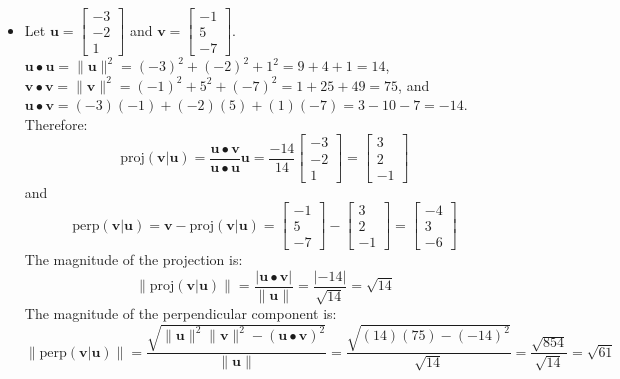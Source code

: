\documentclass{article}
\begin{document}
\begin{itemize}
\item Let \(\mathbf{u} = \begin{bmatrix} -3 \\ -2 \\ 1 \end{bmatrix}\) and \(\mathbf{v} = \begin{bmatrix} -1 \\ 5 \\ -7 \end{bmatrix}\). \\
\(\mathbf{u} \bullet \mathbf{u} = \|\mathbf{u}\|^2 = (-3)^2 + (-2)^2 + 1^2 = 9 + 4 + 1 = 14\), \\
\(\mathbf{v} \bullet \mathbf{v} = \|\mathbf{v}\|^2 = (-1)^2 + 5^2 + (-7)^2 = 1 + 25 + 49 = 75\), and \\ 
\(\mathbf{u} \bullet \mathbf{v} = (-3)(-1) + (-2)(5) + (1)(-7) = 3 - 10 - 7 = -14\). Therefore:
\[\text{proj}(\mathbf{v}|\mathbf{u}) = \frac{\mathbf{u} \bullet \mathbf{v}}{\mathbf{u} \bullet \mathbf{u}}\mathbf{u} = \frac{-14}{14}\begin{bmatrix} -3 \\ -2 \\ 1 \end{bmatrix} = \begin{bmatrix} 3 \\ 2 \\ -1 \end{bmatrix}\]
and 
\[\text{perp}(\mathbf{v}|\mathbf{u}) = \mathbf{v} - \text{proj}(\mathbf{v}|\mathbf{u}) = \begin{bmatrix} -1 \\ 5 \\ -7 \end{bmatrix} - \begin{bmatrix} 3 \\ 2 \\ -1 \end{bmatrix} = \begin{bmatrix} -4 \\ 3 \\ -6 \end{bmatrix}\]
The magnitude of the projection is:
\[\|\text{proj}(\mathbf{v}|\mathbf{u})\| = \frac{|\mathbf{u} \bullet \mathbf{v}|}{\|\mathbf{u}\|} = \frac{|-14|}{\sqrt{14}} = \sqrt{14}\]
The magnitude of the perpendicular component is:
\[\|\text{perp}(\mathbf{v}|\mathbf{u})\| = \frac{\sqrt{\|\mathbf{u}\|^2\|\mathbf{v}\|^2 - (\mathbf{u} \bullet \mathbf{v})^2}}{\|\mathbf{u}\|} = \frac{\sqrt{(14)(75) - (-14)^2}}{\sqrt{14}} = \frac{\sqrt{854}}{\sqrt{14}} = \sqrt{61}\]

\end{itemize}
\end{document}
